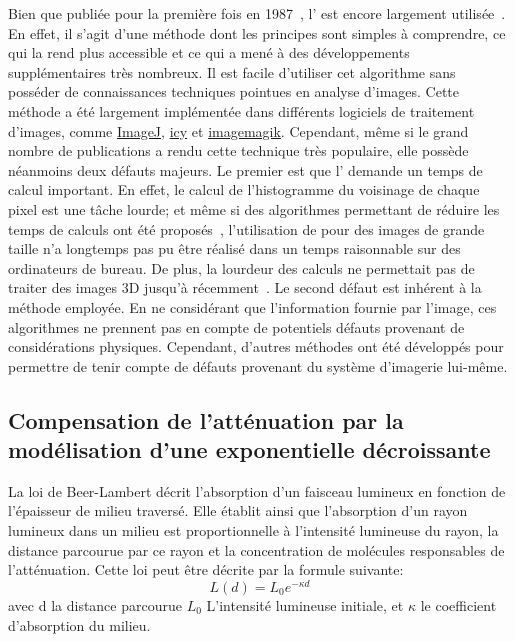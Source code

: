 \documentclass[\main/main.tex]{subfiles}
\begin{document}
%
Bien que publiée pour la première fois en 1987~\cite{pizer_1987},
l'\clahe{} est encore largement utilisée~\cite{dabass_2019,sonali_2018,lv_2019}.
%
En effet, il s'agit d'une méthode dont les principes sont simples à comprendre, ce qui la rend plus accessible et ce qui a mené à des développements supplémentaires très nombreux. Il est facile d'utiliser cet algorithme sans posséder de connaissances techniques pointues en analyse d'images.
%
Cette méthode a été largement implémentée dans différents logiciels de traitement d'images, comme \href{https://imagej.net/Enhance_Local_Contrast_(CLAHE)}{ImageJ},
\href{http://icy.bioimageanalysis.org/plugin/adaptive-histogram-equalization/}{icy} et \href{https://imagemagick.org/script/clahe.php}{imagemagik}.
%
Cependant, même si le grand nombre  de publications a rendu cette technique très populaire, elle possède néanmoins deux défauts majeurs.
%
Le premier est que l'\clahe{} demande un temps de calcul important.
%
En effet, le calcul de l'histogramme du voisinage de chaque pixel est une tâche lourde; et même si des algorithmes permettant de réduire les temps de calculs ont été proposés~\cite{sund_2006}, l'utilisation de \clahe{} pour des images de grande taille n'a longtemps pas pu être réalisé dans un temps raisonnable sur des ordinateurs de bureau. De plus, la lourdeur des calculs ne permettait pas de traiter des images 3D jusqu'à récemment~\cite{amorim_2018, stimper_2019}.
%
Le second défaut est inhérent à la méthode employée.
%
En ne considérant que l'information fournie par l'image, ces algorithmes ne prennent pas en compte de potentiels défauts provenant de considérations physiques.
%
Cependant, d'autres méthodes ont été développés pour permettre de tenir compte de défauts provenant du système d'imagerie lui-même.

\subsection{Compensation de l'atténuation par la modélisation d'une exponentielle décroissante} %

%
\label{sec:beer}
La loi de Beer-Lambert décrit l'absorption d'un faisceau lumineux en fonction de l'épaisseur de milieu traversé. Elle établit ainsi que l'absorption d'un rayon lumineux dans un milieu est proportionnelle à l'intensité lumineuse du rayon, la distance parcourue par ce rayon et la concentration de molécules responsables de l'atténuation.
%
Cette loi peut être décrite par la formule suivante:
\begin{equation}
    L(d) = L_{0}e^{-\kappa{}d}
\end{equation}
avec d la distance parcourue $L_{0}$ L'intensité lumineuse initiale, et $\kappa{}$ le coefficient d'absorption du milieu.
\end{document}

